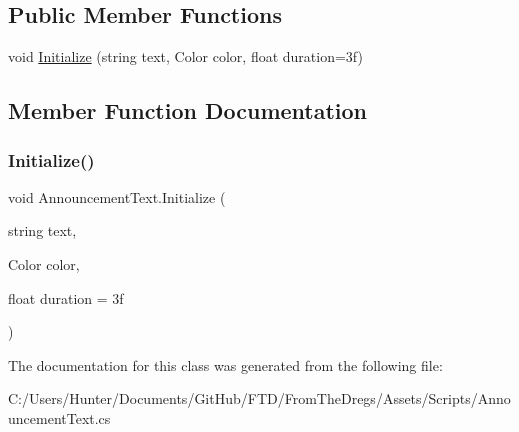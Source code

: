\subsection*{Public Member Functions}
\begin{DoxyCompactItemize}
\item 
void \mbox{\hyperlink{class_announcement_text_a73025e6ac4349a61de65728eb1c926f9}{Initialize}} (string text, Color color, float duration=3f)
\end{DoxyCompactItemize}


\subsection{Member Function Documentation}
\mbox{\label{class_announcement_text_a73025e6ac4349a61de65728eb1c926f9}} 
\subsubsection{\texorpdfstring{Initialize()}{Initialize()}}
{\footnotesize\ttfamily void Announcement\+Text.\+Initialize (\begin{DoxyParamCaption}\item[{string}]{text,  }\item[{Color}]{color,  }\item[{float}]{duration = {\ttfamily 3f} }\end{DoxyParamCaption})}



The documentation for this class was generated from the following file\+:\begin{DoxyCompactItemize}
\item 
C\+:/\+Users/\+Hunter/\+Documents/\+Git\+Hub/\+F\+T\+D/\+From\+The\+Dregs/\+Assets/\+Scripts/Announcement\+Text.\+cs\end{DoxyCompactItemize}
